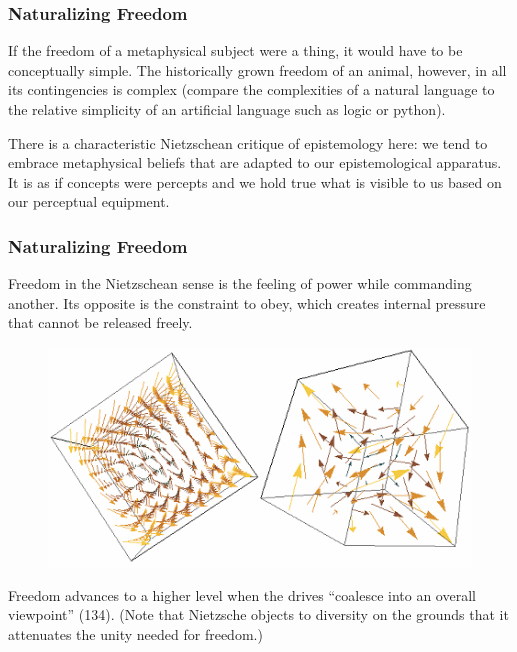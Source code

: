 \documentclass[xcolor=dvipsnames]{beamer}
\begin{document}
\begin{frame}
  \frametitle{Naturalizing Freedom}
If the freedom of a metaphysical subject were a thing, it would have
to be conceptually simple. The historically grown freedom of an
animal, however, in all its contingencies is complex (compare the
complexities of a natural language to the relative simplicity of an
artificial language such as logic or python).

\bigskip

There is a characteristic Nietzschean critique of epistemology here:
we tend to embrace metaphysical beliefs that are adapted to our
epistemological apparatus. It is as if concepts were percepts and we
hold true what is visible to us based on our perceptual equipment.
\end{frame}

\begin{frame}
  \frametitle{Naturalizing Freedom}
  Freedom in the Nietzschean sense is the feeling of power while
  commanding another. Its opposite is the constraint to obey, which
  creates internal pressure that cannot be released freely.
    \begin{figure}[h]
    \includegraphics[scale=1.2]{./3D-vector-field.png}
  \end{figure}
  Freedom advances to a higher level when the drives ``coalesce into an
  overall viewpoint'' (134). (Note that Nietzsche objects to diversity
  on the grounds that it attenuates the unity needed for freedom.)
\end{frame}
\end{document}
